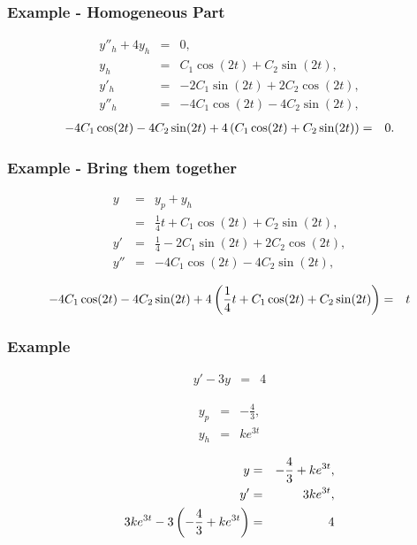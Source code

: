 \begin{frame}
  \frametitle{Example - Homogeneous Part}

  \begin{eqnarray*}
    y''_h + 4y_h & = & 0, \\
    y_h & = & C_1 \cos(2t) + C_2 \sin(2t), \\
    y'_h & = & -2 C_1 \sin(2t) + 2 C_2 \cos(2t), \\
    y''_h & = & -4 C_1 \cos(2t) - 4 C_2 \sin(2t),
  \end{eqnarray*}
  \begin{eqnarray*}
    -4 C_1 \cos(2t) - 4 C_2 \sin(2t) + 4\left( C_1 \cos(2t) + C_2 \sin(2t) \right) & = & 0.
  \end{eqnarray*}

\end{frame}


\begin{frame}
  \frametitle{Example - Bring them together}

  \begin{eqnarray*}
    y & = & y_p + y_h \\
    & = & \frac{1}{4} t + C_1 \cos(2t) + C_2 \sin(2t), \\
    y' & = & \frac{1}{4} - 2 C_1 \sin(2t) + 2 C_2 \cos(2t), \\
    y'' & = & - 4 C_1 \cos(2t) - 4 C_2 \sin(2t),
  \end{eqnarray*}

  \begin{eqnarray*}
    - 4 C_1 \cos(2t) - 4 C_2 \sin(2t) + 4 \left( \frac{1}{4} t + C_1 \cos(2t) + C_2 \sin(2t) \right) & = & t
  \end{eqnarray*}

\end{frame}


\begin{frame}
  \frametitle{Example}

  \begin{eqnarray*}
    y' - 3y & = & 4
  \end{eqnarray*}

  \begin{eqnarray*}
    y_p & = & -\frac{4}{3}, \\
    y_h & = & k e^{3t}
  \end{eqnarray*}

  \begin{eqnarray*}
    y & = & -\frac{4}{3} + k e^{3t}, \\
    y' & = & 3 k e^{3t}, \\
    3 k e^{3t} - 3 \left( -\frac{4}{3} + k e^{3t} \right) & = & 4
  \end{eqnarray*}


\end{frame}


